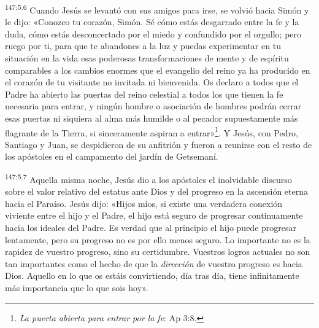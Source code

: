 \par 
\textsuperscript{147:5.6} Cuando Jesús se levantó con sus amigos para irse, se volvió hacia Simón y le dijo: «Conozco tu corazón, Simón. Sé cómo estás desgarrado entre la fe y la duda, cómo estás desconcertado por el miedo y confundido por el orgullo; pero ruego por ti, para que te abandones a la luz y puedas experimentar en tu situación en la vida esas poderosas transformaciones de mente y de espíritu comparables a los cambios enormes que el evangelio del reino ya ha producido en el corazón de tu visitante no invitada ni bienvenida. Os declaro a todos que el Padre ha abierto las puertas del reino celestial a todos los que tienen la fe necesaria para entrar, y ningún hombre o asociación de hombres podrán cerrar esas puertas ni siquiera al alma más humilde o al pecador supuestamente más flagrante de la Tierra, si sinceramente aspiran a entrar»\footnote{\textit{La puerta abierta para entrar por la fe}: Ap 3:8.}. Y Jesús, con Pedro, Santiago y Juan, se despidieron de su anfitrión y fueron a reunirse con el resto de los apóstoles en el campamento del jardín de Getsemaní.

\par 
\textsuperscript{147:5.7} Aquella misma noche, Jesús dio a los apóstoles el inolvidable discurso sobre el valor relativo del estatus ante Dios y del progreso en la ascensión eterna hacia el Paraíso. Jesús dijo: «Hijos míos, si existe una verdadera conexión viviente entre el hijo y el Padre, el hijo está seguro de progresar continuamente hacia los ideales del Padre. Es verdad que al principio el hijo puede progresar lentamente, pero su progreso no es por ello menos seguro. Lo importante no es la rapidez de vuestro progreso, sino su certidumbre. Vuestros logros actuales no son tan importantes como el hecho de que la \textit{dirección} de vuestro progreso es hacia Dios. Aquello en lo que os estáis convirtiendo, día tras día, tiene infinitamente más importancia que lo que sois hoy».

